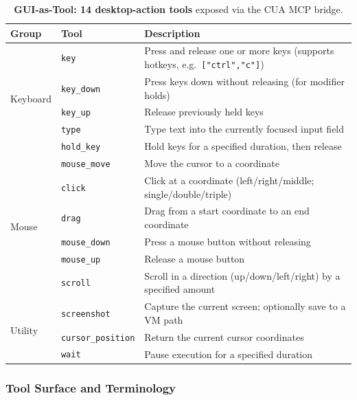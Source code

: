 \begin{table}[h]
\caption{\textbf{GUI-as-Tool: 14 desktop-action tools} exposed via the CUA MCP bridge.}
\label{tab:gui-tools}
\centering
\small
\begin{tabular}{@{}llp{7.2cm}@{}}
\toprule
Group & Tool & Description \\
\midrule
\multirow{5}{*}{Keyboard}
 & \texttt{key} & Press and release one or more keys (supports hotkeys, e.g.\ \texttt{["ctrl","c"]}) \\
 & \texttt{key\_down} & Press keys down without releasing (for modifier holds) \\
 & \texttt{key\_up} & Release previously held keys \\
 & \texttt{type} & Type text into the currently focused input field \\
 & \texttt{hold\_key} & Hold keys for a specified duration, then release \\
\midrule
\multirow{6}{*}{Mouse}
 & \texttt{mouse\_move} & Move the cursor to a coordinate \\
 & \texttt{click} & Click at a coordinate (left/right/middle; single/double/triple) \\
 & \texttt{drag} & Drag from a start coordinate to an end coordinate \\
 & \texttt{mouse\_down} & Press a mouse button without releasing \\
 & \texttt{mouse\_up} & Release a mouse button \\
 & \texttt{scroll} & Scroll in a direction (up/down/left/right) by a specified amount \\
\midrule
\multirow{3}{*}{Utility}
 & \texttt{screenshot} & Capture the current screen; optionally save to a VM path \\
 & \texttt{cursor\_position} & Return the current cursor coordinates \\
 & \texttt{wait} & Pause execution for a specified duration \\
\bottomrule
\end{tabular}
\end{table}

\subsubsection{Tool Surface and Terminology}
\label{app:tool-surface}

